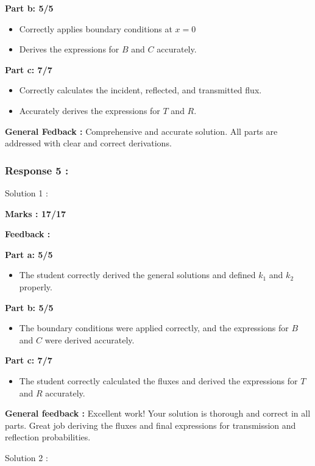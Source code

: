 \documentclass[a4paper,11pt]{article}
\begin{document}
\textbf{Part b: 5/5}
\begin{itemize}
    \item Correctly applies boundary conditions at $x = 0$
    \item Derives the expressions for $B$ and $C$ accurately.
\end{itemize}

\textbf{Part c: 7/7}
\begin{itemize}
    \item Correctly calculates the incident, reflected, and transmitted flux.
    \item Accurately derives the expressions for $T$ and $R$.
\end{itemize}

\textbf{General Fedback :}
Comprehensive and accurate solution. All parts are addressed with clear and correct derivations.


\subsubsection*{Response 5 :}


Solution 1 : 

\textbf{Marks : 17/17}

\textbf{Feedback :}

\textbf{Part a: 5/5}
\begin{itemize}
    \item The student correctly derived the general solutions and defined $k_1$ and $k_2$ properly.
\end{itemize}


\textbf{Part b: 5/5}
\begin{itemize}
    \item The boundary conditions were applied correctly, and the expressions for $B$ and $C$ were derived accurately.
\end{itemize}

\textbf{Part c: 7/7}
\begin{itemize}
    \item The student correctly calculated the fluxes and derived the expressions for $T$ and $R$ accurately.
\end{itemize}


\textbf{General feedback :}
Excellent work! Your solution is thorough and correct in all parts. Great job deriving the fluxes and final expressions for transmission and reflection probabilities.


Solution 2 :
\end{document}

